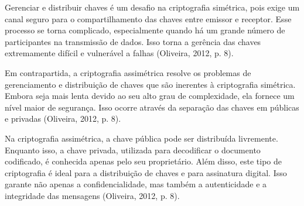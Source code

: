 Gerenciar e distribuir chaves é um desafio na criptografia simétrica, pois
exige um canal seguro para o compartilhamento das chaves entre emissor e
receptor. Esse processo se torna complicado, especialmente quando há um grande
número de participantes na transmissão de dados. Isso torna a gerência das
chaves extremamente difícil e vulnerável a falhas (Oliveira, 2012, p. 8).

Em contrapartida, a criptografia assimétrica resolve os problemas de
gerenciamento e distribuição de chaves que são inerentes à criptografia
simétrica. Embora seja mais lenta devido ao seu alto grau de complexidade, ela
fornece um nível maior de segurança. Isso ocorre através da separação das
chaves em públicas e privadas (Oliveira, 2012, p. 8).

Na criptografia assimétrica, a chave pública pode ser distribuída livremente.
Enquanto isso, a chave privada, utilizada para decodificar o documento
codificado, é conhecida apenas pelo seu proprietário. Além disso, este tipo de
criptografia é ideal para a distribuição de chaves e para assinatura digital.
Isso garante não apenas a confidencialidade, mas também a autenticidade e a
integridade das mensagens (Oliveira, 2012, p. 8).



